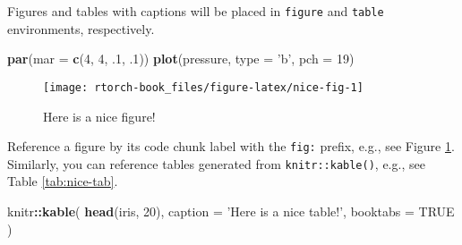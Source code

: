\documentclass[]{book}
\newenvironment{Shaded}{\begin{snugshade}}{\end{snugshade}}
\newcommand{\DataTypeTok}[1]{\textcolor[rgb]{0.13,0.29,0.53}{#1}}
\newcommand{\DecValTok}[1]{\textcolor[rgb]{0.00,0.00,0.81}{#1}}
\newcommand{\FloatTok}[1]{\textcolor[rgb]{0.00,0.00,0.81}{#1}}
\newcommand{\KeywordTok}[1]{\textcolor[rgb]{0.13,0.29,0.53}{\textbf{#1}}}
\newcommand{\NormalTok}[1]{#1}
\newcommand{\OperatorTok}[1]{\textcolor[rgb]{0.81,0.36,0.00}{\textbf{#1}}}
\newcommand{\OtherTok}[1]{\textcolor[rgb]{0.56,0.35,0.01}{#1}}
\newcommand{\StringTok}[1]{\textcolor[rgb]{0.31,0.60,0.02}{#1}}
\begin{document}
Figures and tables with captions will be placed in \texttt{figure} and \texttt{table} environments, respectively.

\begin{Shaded}
\begin{Highlighting}[]
\KeywordTok{par}\NormalTok{(}\DataTypeTok{mar =} \KeywordTok{c}\NormalTok{(}\DecValTok{4}\NormalTok{, }\DecValTok{4}\NormalTok{, }\FloatTok{.1}\NormalTok{, }\FloatTok{.1}\NormalTok{))}
\KeywordTok{plot}\NormalTok{(pressure, }\DataTypeTok{type =} \StringTok{'b'}\NormalTok{, }\DataTypeTok{pch =} \DecValTok{19}\NormalTok{)}
\end{Highlighting}
\end{Shaded}

\begin{figure}

{\centering \texttt{[image: rtorch-book\_files/figure-latex/nice-fig-1]} 

}

\caption{Here is a nice figure!}\label{fig:nice-fig}
\end{figure}

Reference a figure by its code chunk label with the \texttt{fig:} prefix, e.g., see Figure \ref{fig:nice-fig}. Similarly, you can reference tables generated from \texttt{knitr::kable()}, e.g., see Table \ref{tab:nice-tab}.

\begin{Shaded}
\begin{Highlighting}[]
\NormalTok{knitr}\OperatorTok{::}\KeywordTok{kable}\NormalTok{(}
  \KeywordTok{head}\NormalTok{(iris, }\DecValTok{20}\NormalTok{), }\DataTypeTok{caption =} \StringTok{'Here is a nice table!'}\NormalTok{,}
  \DataTypeTok{booktabs =} \OtherTok{TRUE}
\NormalTok{)}
\end{Highlighting}
\end{Shaded}
\end{document}
